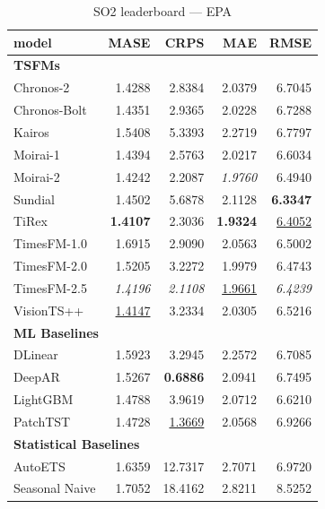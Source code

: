 \begin{table}[H]
\caption{SO2 leaderboard --- EPA}
\centering
\begin{small}
\begin{tabular}{lrrrr}
\toprule
model & MASE & CRPS & MAE & RMSE \\
\midrule
\multicolumn{5}{l}{\textbf{TSFMs}} \\
Chronos-2 & 1.4288 & 2.8384 & 2.0379 & 6.7045 \\
Chronos-Bolt & 1.4351 & 2.9365 & 2.0228 & 6.7288 \\
Kairos & 1.5408 & 5.3393 & 2.2719 & 6.7797 \\
Moirai-1 & 1.4394 & 2.5763 & 2.0217 & 6.6034 \\
Moirai-2 & 1.4242 & 2.2087 & \textit{1.9760} & 6.4940 \\
Sundial & 1.4502 & 5.6878 & 2.1128 & \textbf{6.3347} \\
TiRex & \textbf{1.4107} & 2.3036 & \textbf{1.9324} & \underline{6.4052} \\
TimesFM-1.0 & 1.6915 & 2.9090 & 2.0563 & 6.5002 \\
TimesFM-2.0 & 1.5205 & 3.2272 & 1.9979 & 6.4743 \\
TimesFM-2.5 & \textit{1.4196} & \textit{2.1108} & \underline{1.9661} & \textit{6.4239} \\
VisionTS++ & \underline{1.4147} & 3.2334 & 2.0305 & 6.5216 \\
\midrule
\multicolumn{5}{l}{\textbf{ML Baselines}} \\
DLinear & 1.5923 & 3.2945 & 2.2572 & 6.7085 \\
DeepAR & 1.5267 & \textbf{0.6886} & 2.0941 & 6.7495 \\
LightGBM & 1.4788 & 3.9619 & 2.0712 & 6.6210 \\
PatchTST & 1.4728 & \underline{1.3669} & 2.0568 & 6.9266 \\
\midrule
\multicolumn{5}{l}{\textbf{Statistical Baselines}} \\
AutoETS & 1.6359 & 12.7317 & 2.7071 & 6.9720 \\
Seasonal Naive & 1.7052 & 18.4162 & 2.8211 & 8.5252 \\
\bottomrule
\end{tabular}
\end{small}
\end{table}